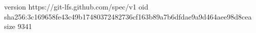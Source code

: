 version https://git-lfs.github.com/spec/v1
oid sha256:3c169658fe43c49b17480372482736cf163b89a7b6dfdae9a9d464aee98d8cea
size 9341
